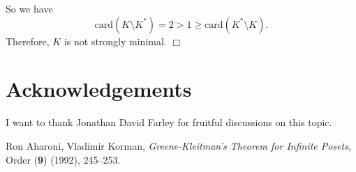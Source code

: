 \documentclass[12pt]{amsart}
\newcommand{\beweisende}{{\hfill $\Box$}}
\newcommand{\card}{{\mathrm{card}}}
\begin{document}
So we have $$\card(K\setminus K^*) = 2 > 1 \geq \card(K^* \setminus K).$$
Therefore, $K$ is not strongly minimal. \beweisende
\section{Acknowledgements}
I want to thank Jonathan David Farley for fruitful discussions
on this topic.
{\footnotesize
\begin{thebibliography}{99}
 Ron Aharoni, Vladimir Korman, {\it
Greene-Kleitman's Theorem for Infinite Posets}, Order
({\bf 9}) (1992),  245--253.
\end{thebibliography}
}
\end{document}
